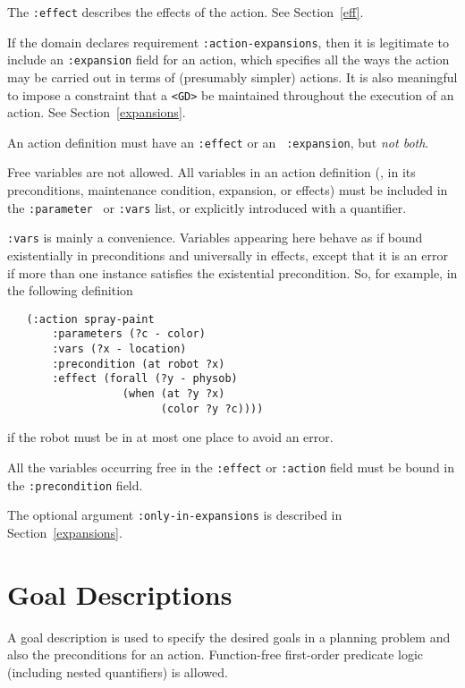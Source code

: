 The {\tt :effect} describes the effects of the action.  See
Section~\ref{eff}.  

If the domain declares requirement {\tt :action-expansions}, then 
it is legitimate to include an {\tt :expansion} field for an action,
which specifies all the ways the action may be carried out in terms of
(presumably simpler) actions.  It is also meaningful to impose a
constraint that a {\tt <GD>} be maintained throughout the execution of
an action.  See Section~\ref{expansions}.

An action definition must have an {\tt :effect} or an {\tt
:expansion}, but {\em not both}.

Free variables are not allowed.  All variables in an action definition
(\ie, in its preconditions, maintenance condition, expansion, or
effects) must be included in the {\tt :parameter } or {\tt :vars}
list, or explicitly introduced with a quantifier.  

{\tt :vars} is mainly a convenience.  Variables appearing here behave as if
bound existentially in preconditions and universally in effects, except that it is
an error if more than one instance satisfies the existential
precondition.  So, 
for example, in the following definition
\begin{verbatim}
   (:action spray-paint
       :parameters (?c - color)
       :vars (?x - location)
       :precondition (at robot ?x)
       :effect (forall (?y - physob)
                  (when (at ?y ?x)
                        (color ?y ?c))))
\end{verbatim}
if the robot must be in at most one place to avoid an error.

All the variables occurring free in the {\tt :effect} or {\tt :action}
field must be bound in the {\tt :precondition} field.

The optional argument {\tt :only-in-expansions} is described in
Section~\ref{expansions}.

    \section{Goal  Descriptions}
    \label{gd}

A goal description is used to specify the desired goals in a planning
problem and also the preconditions for an action.  Function-free
first-order predicate logic (including nested quantifiers) is allowed.

